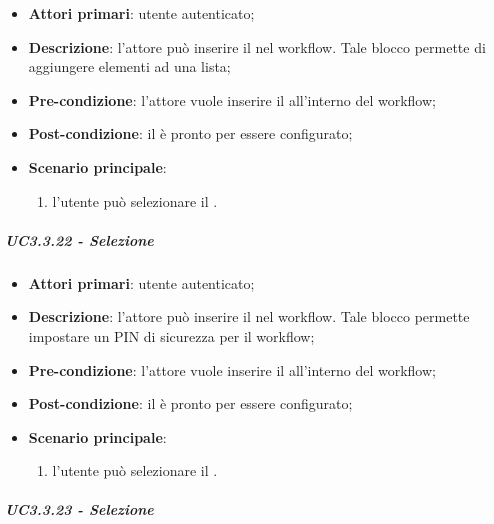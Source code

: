 \begin{itemize}
\item \textbf{Attori primari}: utente autenticato;

\item \textbf{Descrizione}:  l'attore può inserire il \BLista{} nel workflow. Tale blocco permette di aggiungere elementi ad una lista;

\item \textbf{Pre-condizione}: l'attore vuole inserire il \BLista{} all'interno del workflow;

\item \textbf{Post-condizione}: il \BLista{} è pronto per essere configurato;

\item \textbf{Scenario principale}:
\begin{enumerate}
\item  l'utente può selezionare il \BLista{}.

\end{enumerate}
\end{itemize}

\subparagraph{UC3.3.22 - Selezione \BSicurezza{}}

\begin{itemize}
\item \textbf{Attori primari}: utente autenticato;

\item \textbf{Descrizione}:  l'attore può inserire il \BSicurezza{} nel workflow. Tale blocco permette impostare un PIN di sicurezza per il workflow;

\item \textbf{Pre-condizione}: l'attore vuole inserire il \BSicurezza{} all'interno del workflow;

\item \textbf{Post-condizione}: il \BSicurezza{} è pronto per essere configurato;

\item \textbf{Scenario principale}:
\begin{enumerate}
\item  l'utente può selezionare il \BSicurezza{}.

\end{enumerate}
\end{itemize}

\subparagraph{UC3.3.23 - Selezione \BKindle{}}

